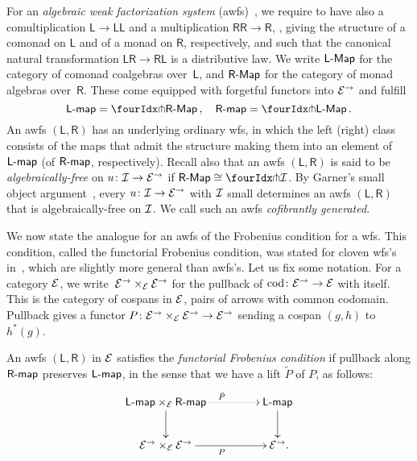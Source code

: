 \documentclass[reqno,10pt,a4paper,oneside,draft]{amsart}
\newcommand{\LL}{\mathsf{L}}
\newcommand{\RR}{\mathsf{R}}
\begin{document}
{{For an \emph{algebraic weak factorization system} (awfs)~\cite{garner:small-object-argument,grandis-tholen-nwfs}, we 
require to have also a comultiplication $\LL \to \LL \LL$ and a multiplication $\RR \RR \to \RR$, , giving the structure of a comonad on $\LL$ and of a monad on $\RR$, respectively, and such that the canonical natural transformation $\LL \RR \to \RR \LL$ is a distributive law. We write $\pCoalg{\LL}$  for the category of comonad coalgebras over~$\LL$, and $\pAlg{\RR}$   for the category of monad algebras over~$\RR$. These come equipped with forgetful functors into $\cal{E}^\to$ and fulfill
\[
\pcoalg{\LL} = \liftl{\pAlg{\RR}}
\, , \quad
\palg{\RR} = \liftr{\pCoalg{\LL}}
\, .\]
An awfs $(\LL, \RR)$ has an underlying ordinary wfs, in which the left (right) class consists of the maps that admit the structure making them into an element of $\pcoalg{\LL}$ (of $\palg{\RR}$, respectively).
Recall also that an awfs $(\LL, \RR)$ is said to be \emph{algebraically-free} on $u \co \cal{I} \to \cal{E}^\to$ if $\pAlg{\RR} \iso \liftr{\cal{I}}$.
By Garner's small object argument~\cite{garner:small-object-argument}, every $u \co \cal{I} \to \cal{E}^\to$ with $\cal{I}$ small determines an awfs $(\LL, \RR)$ that is algebraically-free on $\cal{I}$.
We call such an awfs \emph{cofibrantly generated}.

We now state the analogue for an awfs of the Frobenius condition for a wfs.
This condition, called the functorial Frobenius condition, was stated for cloven wfs's in~\cite{garner:topological-simplicial}, which are slightly more general  than awfs's.
Let us fix some notation.
For a category $\cal{E}$, we write~$\cal{E}^\to \times_\cal{E} \cal{E}^\to$ for the pullback of $\cod \co \cal{E}^\to \to \cal{E}$ with itself.
This is the category of cospans in $\cal{E}$, \ie pairs of arrows with common codomain.
Pullback gives a functor $P \co  \cal{E}^\to \times_{\cal{E}} \cal{E}^\to \to \cal{E}^\to$ sending a cospan $(g, h)$ to $h^*(g)$.

\begin{definition} \label{functorial-frobenius}
An awfs $(\LL, \RR)$ in $\cal{E}$ satisfies the \emph{functorial Frobenius condition} if pullback along $\palg{\RR}$ preserves $\pcoalg{\LL}$, in the sense that we have a lift $\tilde{P}$ of $P$, as follows:
\[
\xymatrix@C+2em{
  \pcoalg{\LL} \times_{\cal{E}} \palg{\RR}
  \ar@{.>}[r]^{\tilde{P}}
  \ar[d]
&
  \pcoalg{\LL}
  \ar[d]
\\
  \cal{E}^\to \times_{\cal{E}} \cal{E}^\to
  \ar[r]_{P}
&
  \cal{E}^\to
\rlap{.}}
\]
\end{definition}

}}
\end{document}
